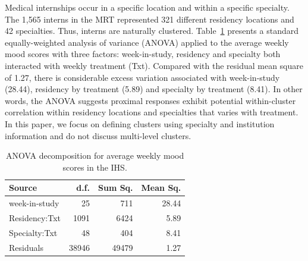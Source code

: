 \documentclass[12pt]{article}
\begin{document}
Medical internships occur in a specific location and within a specific specialty.  The 1,565 interns in the MRT represented 321 different residency locations and 42 specialties.  Thus, interns are naturally clustered.  Table~\ref{tab:IHSanova} presents a standard equally-weighted analysis of variance (ANOVA) applied to the average weekly mood scores with three factors: week-in-study, residency and specialty both interacted with weekly treatment (Txt). Compared with the residual mean square of 1.27, there is considerable excess variation associated with week-in-study (28.44), residency by treatment (5.89) and specialty by treatment (8.41). In other words, the ANOVA suggests proximal responses exhibit potential within-cluster correlation within residency locations and specialties that varies with treatment. In this paper, we focus on defining clusters using specialty and institution information and do not discuss multi-level clusters.

\begin{table}[!th]
\centering
\begin{tabular}{l | rrr}
Source & d.f. & Sum Sq. & Mean Sq. \\ \hline
week-in-study & 25 & 711 & 28.44 \\
Residency:Txt & 1091 & 6424 & 5.89 \\
Specialty:Txt & 48 & 404 & 8.41 \\
Residuals & 38946 & 49479 & 1.27 \\ \hline
\end{tabular}
\label{tab:IHSanova}
\caption{ANOVA decomposition for average weekly mood scores in the IHS.}
\end{table}
\end{document}
